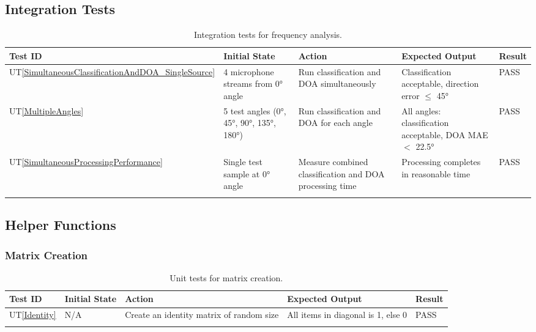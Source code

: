\documentclass[12pt, titlepage]{article}
\newcommand{\utref}[1]{UT\ref{#1}}
\begin{document}
\subsection{Integration Tests}
{\footnotesize
\begin{longtable}{|p{0.8cm}|p{3.5cm}|p{3.5cm}|p{3.5cm}|p{1cm}|}
    \hline
    \textbf{Test ID} & \textbf{Initial State} & \textbf{Action} &
    \textbf{Expected Output} & \textbf{Result} \\ 
    \endfirsthead
    \hline

    \utref{SimultaneousClassificationAndDOA_SingleSource} & 4 microphone streams
    from 0° angle & Run classification and DOA simultaneously & Classification
    acceptable, direction error $\leq$ 45° & PASS\\ \hline
    \utref{MultipleAngles} & 5 test angles (0°, 45°, 90°, 135°, 180°) & Run
    classification and DOA for each angle & All angles: classification
    acceptable, DOA MAE $<$ 22.5° & PASS\\ \hline
    \utref{SimultaneousProcessingPerformance} & Single test sample at 0° angle &
    Measure combined classification and DOA processing time & Processing
    completes in reasonable time & PASS\\ \hline

    \caption{Integration tests for frequency analysis.}
    \label{tab:unit_test_integration}
\end{longtable}
}

\subsection{Helper Functions}

\subsubsection{Matrix Creation}
{\footnotesize
\begin{longtable}{|p{0.8cm}|p{3.5cm}|p{3.5cm}|p{3.5cm}|p{1cm}|}
    \hline
    \textbf{Test ID} & \textbf{Initial State} & \textbf{Action} &
    \textbf{Expected Output} & \textbf{Result} \\ 
    \endfirsthead
    \hline
    
    \utref{Identity} & N/A & Create an identity matrix of random size & All
    items in diagonal is 1, else 0 & PASS\\
    \hline

    \caption{Unit tests for matrix creation.}
    \label{tab:unit_test_matrix_creation}
\end{longtable}
}
\end{document}
